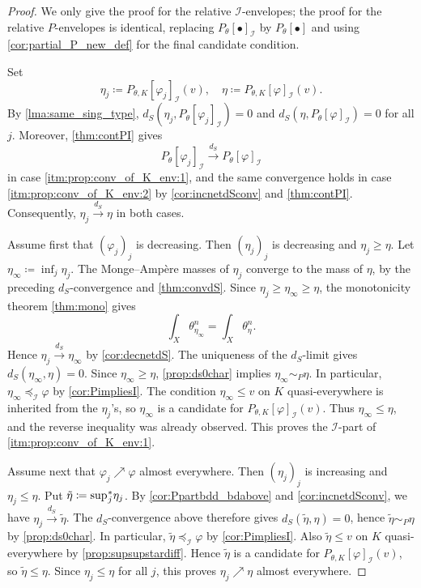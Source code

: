 \begin{proof}
We only give the proof for the relative $\mathcal{I}$-envelopes; the proof for the relative $P$-envelopes is identical, replacing $P_{\theta}[\bullet]_{\mathcal{I}}$ by $P_{\theta}[\bullet]$ and using \cref{cor:partial_P_new_def} for the final candidate condition.

Set
\[
    \eta_j\coloneqq P_{\theta,K}[\varphi_j]_{\mathcal{I}}(v),\quad
    \eta\coloneqq P_{\theta,K}[\varphi]_{\mathcal{I}}(v).
\]
By \cref{lma:same_sing_type}, $d_S(\eta_j,P_{\theta}[\varphi_j]_{\mathcal{I}})=0$ and $d_S(\eta,P_{\theta}[\varphi]_{\mathcal{I}})=0$ for all $j$. Moreover, \cref{thm:contPI} gives
\[
    P_{\theta}[\varphi_j]_{\mathcal{I}}\xrightarrow{d_S}P_{\theta}[\varphi]_{\mathcal{I}}
\]
in case \ref{itm:prop:conv_of_K_env:1}, and the same convergence holds in case \ref{itm:prop:conv_of_K_env:2} by \cref{cor:incnetdSconv} and \cref{thm:contPI}.
Consequently, $\eta_j\xrightarrow{d_S}\eta$ in both cases.

Assume first that $(\varphi_j)_j$ is decreasing. Then $(\eta_j)_j$ is decreasing and $\eta_j\geq \eta$. Let $\eta_\infty\coloneqq \inf_j \eta_j$. The Monge--Amp\`ere masses of $\eta_j$ converge to the mass of $\eta$, by the preceding $d_S$-convergence and \cref{thm:convdS}. Since $\eta_j\geq \eta_\infty\geq \eta$, the monotonicity theorem \cref{thm:mono} gives
\[
    \int_X\theta_{\eta_\infty}^n=\int_X\theta_\eta^n.
\]
Hence $\eta_j\xrightarrow{d_S}\eta_\infty$ by \cref{cor:decnetdS}. The uniqueness of the $d_S$-limit gives $d_S(\eta_\infty,\eta)=0$. Since $\eta_\infty\geq \eta$, \cref{prop:ds0char} implies $\eta_\infty\sim_P \eta$. In particular, $\eta_\infty\preceq_{\mathcal{I}}\varphi$ by \cref{cor:PimpliesI}. The condition $\eta_\infty\leq v$ on $K$ quasi-everywhere is inherited from the $\eta_j$'s, so $\eta_\infty$ is a candidate for $P_{\theta,K}[\varphi]_{\mathcal{I}}(v)$. Thus $\eta_\infty\leq \eta$, and the reverse inequality was already observed. This proves the $\mathcal{I}$-part of \ref{itm:prop:conv_of_K_env:1}.

Assume next that $\varphi_j\nearrow\varphi$ almost everywhere. Then $(\eta_j)_j$ is increasing and $\eta_j\leq \eta$. Put $\tilde\eta\coloneqq \operatorname*{sup}_{}{}\!{}^{*}_j \eta_j$. By \cref{cor:Ppartbdd_bdabove} and \cref{cor:incnetdSconv}, we have $\eta_j\xrightarrow{d_S}\tilde\eta$. The $d_S$-convergence above therefore gives $d_S(\tilde\eta,\eta)=0$, hence $\tilde\eta\sim_P \eta$ by \cref{prop:ds0char}. In particular, $\tilde\eta\preceq_{\mathcal{I}}\varphi$ by \cref{cor:PimpliesI}. Also $\tilde\eta\leq v$ on $K$ quasi-everywhere by \cref{prop:supsupstardiff}. Hence $\tilde\eta$ is a candidate for $P_{\theta,K}[\varphi]_{\mathcal{I}}(v)$, so $\tilde\eta\leq \eta$. Since $\eta_j\leq \eta$ for all $j$, this proves $\eta_j\nearrow \eta$ almost everywhere.
\end{proof}







